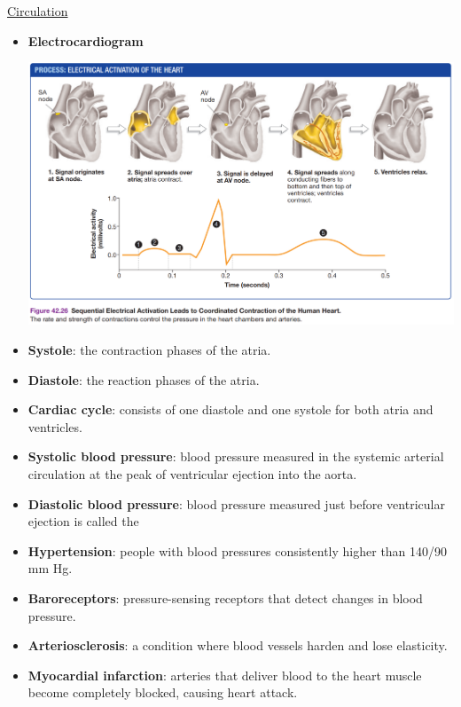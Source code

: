 \documentclass[12pt,letterpaper]{article}
\begin{document}
\begin{secbox}{\hyperlink{42}{Circulation}}
{\begin{itemize}
        \item \textbf{Electrocardiogram}
        \begin{center}
            \includegraphics[scale=0.4]{images/ekg.png}    
        \end{center}
        \vspace{-18pt}
        \item \textbf{Systole}: the contraction phases of the atria.
        \item \textbf{Diastole}: the reaction phases of the atria.
        \item \textbf{Cardiac cycle}: consists of one
        diastole and one systole for both atria and ventricles.
        \item \textbf{Systolic blood pressure}: blood pressure measured
        in the systemic arterial circulation at the peak of ventricular ejection into the aorta.
        \item \textbf{Diastolic blood pressure}: blood
        pressure measured just before ventricular ejection is called the
        \item \textbf{Hypertension}: people with blood pressures consistently higher than 140/90 mm Hg.
        \item \textbf{Baroreceptors}: pressure-sensing receptors that detect changes in blood pressure.
        \item \textbf{Arteriosclerosis}: a condition where blood vessels harden and lose elasticity.
        \item \textbf{Myocardial infarction}: arteries that deliver blood to the heart muscle become completely blocked, causing heart attack. 
    \end{itemize}
}\end{secbox}
\end{document}
